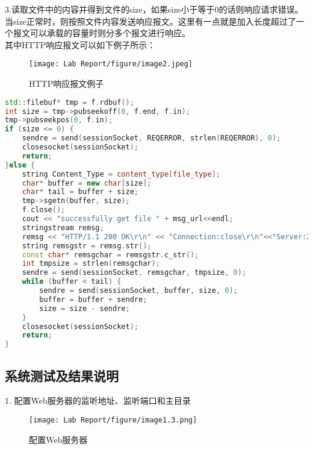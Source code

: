 \hspace*{2em}3.读取文件中的内容并得到文件的size，如果size小于等于0的话则响应请求错误。当size正常时，则按照文件内容发送响应报文。这里有一点就是加入长度超过了一个报文可以承载的容量时则分多个报文进行响应。\\
\hspace*{2em}其中HTTP响应报文可以如下例子所示：\\
\begin{figure}[htbp] %
\centering %
\texttt{[image: Lab Report/figure/image2.jpeg]}
\caption{HTTP响应报文例子} %
\end{figure}
\begin{lstlisting}[language=c++]
std::filebuf* tmp = f.rdbuf();
int size = tmp->pubseekoff(0, f.end, f.in);
tmp->pubseekpos(0, f.in);
if (size <= 0) {
	sendre = send(sessionSocket, REQERROR, strlen(REQERROR), 0);
	closesocket(sessionSocket);
	return;
}else {
	string Content_Type = content_type[file_type];
	char* buffer = new char[size];
	char* tail = buffer + size;
	tmp->sgetn(buffer, size);
	f.close();
	cout << "successfully get file " + msg_url<<endl;
	stringstream remsg;
	remsg << "HTTP/1.1 200 OK\r\n" << "Connection:close\r\n"<<"Server:Zou Ya\r\n" << "Content Length:" << size	<< "\r\n" << "Content Type:" + Content_Type << "\r\n\r\n";
	string remsgstr = remsg.str();
	const char* remsgchar = remsgstr.c_str();
	int tmpsize = strlen(remsgchar);
	sendre = send(sessionSocket, remsgchar, tmpsize, 0);
	while (buffer < tail) {
		sendre = send(sessionSocket, buffer, size, 0);
		buffer = buffer + sendre;
		size = size - sendre;
	}
	closesocket(sessionSocket);
	return;
}
\end{lstlisting}
\subsection{系统测试及结果说明}
\hspace*{2em}1. 配置Web服务器的监听地址、监听端口和主目录\\
\begin{figure}[H] %
\centering %
\texttt{[image: Lab Report/figure/image1.3.png]}
\caption{配置Web服务器} %
\end{figure}

